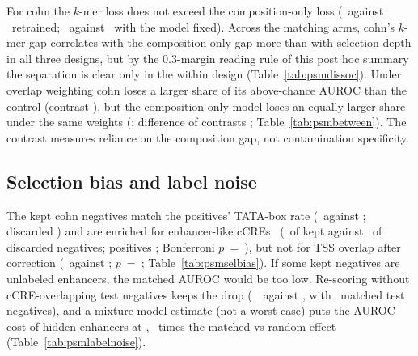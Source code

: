 \documentclass[journal,onecolumn,10pt,letterpaper]{IEEEtran}
\newcommand{\tasku}{\textunderscore\allowbreak}
\DeclareRobustCommand{\task}[1]{{\normalfont\ttfamily\upshape\let\_\tasku #1}}
\begin{document}
For \task{cohn} the $k$-mer loss does not exceed the composition-only loss (\smMvrPoint\ against
\smCohnWithinC\ retrained; \smCohnFixedK\ against \smCohnFixedC\ with the model fixed). Across the
matching arms, \task{cohn}'s $k$-mer gap correlates with the composition-only gap more than with
selection depth in all three designs, but by the 0.3-margin reading rule of this post hoc summary the
separation is clear only in the within design (Table~\ref{tab:psmdissoc}). Under overlap weighting \task{cohn} loses a larger share
of its above-chance AUROC than the control (contrast \smBetK), but the composition-only model loses an
equally larger share under the same weights (\smBetC; difference of contrasts \smBetDoc;
Table~\ref{tab:psmbetween}). The contrast measures reliance on the composition gap, not contamination
specificity.




\subsection{Selection bias and label noise}
The kept \task{cohn} negatives match the positives' TATA-box rate (\smTataKept\ against \smTataPos;
discarded \smTataDisc) and are enriched for enhancer-like cCREs~\cite{encode2020} (\smElsKept\ of kept
against \smElsDisc\ of discarded negatives; positives \smElsPos; Bonferroni $p$~=~\smElsP), but not for
TSS overlap after correction (\smTssKept\ against \smTssDisc; $p$~=~\smTssP; Table~\ref{tab:psmselbias}).
If some kept negatives are unlabeled enhancers, the matched AUROC would be too low. Re-scoring
without cCRE-overlapping test negatives keeps the drop (\smCcreFree\ \smCcreFreeCI\ against
\smCcreFreeR, with \smCcreFreeN\ matched test negatives), and a mixture-model estimate (not a
worst case) puts the AUROC cost of hidden enhancers at \smLabelNoise, \smLabelNoiseRatio\ times the
matched-vs-random effect (Table~\ref{tab:psmlabelnoise}).



\end{document}
